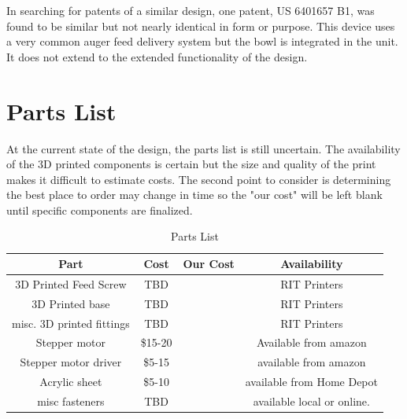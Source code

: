 \documentclass[12pt]{article}
\begin{document}

In searching for patents of a similar design, one patent, US 6401657 B1, was found to be similar but not nearly identical in form or purpose. This device uses a very common auger feed delivery system but the bowl is integrated in the unit. It does not extend to the extended functionality of the design. 

\section{Parts List}
    At the current state of the design, the parts list is still uncertain. The availability of the 3D printed
    components is certain but the size and quality of the print makes it difficult to estimate costs. 
    The second point to consider is determining the best place to order may change in time so the "our cost" 
    will be left blank until specific components are finalized.
    \begin{table}[h]
\caption{Parts List} %
\centering %
\begin{tabular}{c c c c} %
\hline\hline %
    Part & Cost & Our Cost & Availability \\ %
\hline %
    3D Printed Feed Screw & TBD& & RIT Printers \\
    3D Printed base & TBD& & RIT Printers\\
    misc. 3D printed fittings & TBD& & RIT Printers\\
    Stepper motor & \$15-20 & & Available from amazon \\
    Stepper motor driver & \$5-15 & & available from amazon \\
    Acrylic sheet & \$5-10 & & available from Home Depot \\
    misc fasteners & TBD & & available local or online. \\

    \hline %
\end{tabular}
\label{table:bom} %
\end{table}
\end{document}
